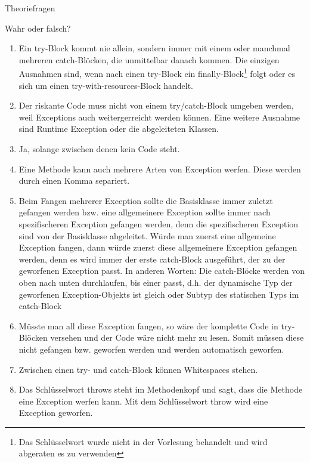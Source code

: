 \documentclass{../preamble}
\begin{document}
\begin{task}[credit = \stars{0}{3}]{Theoriefragen}
\begin{subtask*}{Wahr oder falsch?}
        \begin{solution}
            \begin{enumerate}[label = (\Alph*)]
                \item Ein \textcolor{keywordcolor}{try}-Block kommt nie allein, sondern immer mit einem oder manchmal mehreren \textcolor{keywordcolor}{catch}-Blöcken, die unmittelbar danach kommen. Die einzigen Ausnahmen sind, wenn nach einen \textcolor{keywordcolor}{try}-Block ein \textcolor{keywordcolor}{finally}-Block\footnote{Das Schlüsselwort wurde nicht in der Vorlesung behandelt und wird abgeraten es zu verwenden} folgt oder es sich um einen \textcolor{keywordcolor}{try-with-resources}-Block handelt.
                \item Der riskante Code muss nicht von einem \textcolor{keywordcolor}{try}/\textcolor{keywordcolor}{catch}-Block umgeben werden, weil Exceptions auch weitergerreicht werden können. Eine weitere Ausnahme sind Runtime Exception oder die abgeleiteten Klassen.
                \item Ja, solange zwischen denen kein Code steht.
                \item Eine Methode kann auch mehrere Arten von Exception werfen. Diese werden durch einen Komma separiert.
                \item Beim Fangen mehrerer Exception sollte die Basisklasse immer zuletzt gefangen werden bzw. eine allgemeinere Exception sollte immer nach spezifischeren Exception gefangen werden, denn die spezifischeren Exception sind von der Basisklasse abgeleitet. Würde man zuerst eine allgemeine Exception fangen, dann würde zuerst diese allgemeinere Exception gefangen werden, denn es wird immer der erste \textcolor{keywordcolor}{catch}-Block ausgeführt, der zu der geworfenen Exception passt.
                      \br
                      In anderen Worten: Die \textcolor{keywordcolor}{catch}-Blöcke werden von oben nach unten durchlaufen, bis einer passt, d.h. der dynamische Typ der geworfenen Exception-Objekts ist gleich oder Subtyp des statischen Typs im \textcolor{keywordcolor}{catch}-Block
                \item Müsste man all diese Exception fangen, so wäre der komplette Code in \textcolor{keywordcolor}{try}-Blöcken versehen und der Code wäre nicht mehr zu lesen. Somit müssen diese nicht gefangen bzw. geworfen werden und werden automatisch geworfen.
                \item Zwischen einen \textcolor{keywordcolor}{try}- und \textcolor{keywordcolor}{catch}-Block können Whitespaces stehen.
                \item Das Schlüsselwort \textcolor{keywordcolor}{throws} steht im Methodenkopf und sagt, dass die Methode eine Exception werfen kann. Mit dem Schlüsselwort \textcolor{keywordcolor}{throw} wird eine Exception geworfen.
            \end{enumerate}
        \end{solution}
    \end{subtask*}
\end{task}
\end{document}
